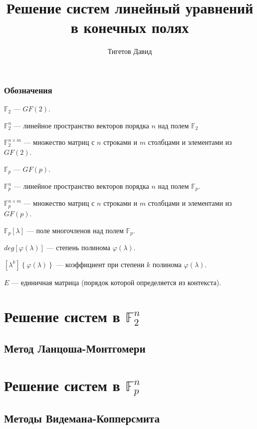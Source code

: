 \documentclass[a4paper,12pt]{book}
\newcommand{\gftwo}{\mathbb{F}_2}
\newcommand{\gftwovector}[1]{\mathbb{F}^{#1}_2}
\newcommand{\gftwomatrix}[2]{\mathbb{F}^{#1 \times #2}_2}
\newcommand{\gfpmatrix}[2]{\mathbb{F}^{#1 \times #2}_p}
\newcommand{\gfpvector}[1]{\mathbb{F}^{#1}_p}
\newcommand{\gfp}{\mathbb{F}_p}
\newcommand{\gfppolynomial}{\gfp \left [ \lambda \right ]}
\newcommand{\polynomial}[1]{ #1 (\lambda)}
\newcommand{\polynomialdegree}[1]{ deg \left [ \polynomial{#1} \right ] }
\newcommand{\degreecoefficient}[2]{ \left [ \lambda^{#1} \right ] \left \{ #2 \right \} }
\begin{document}
\title{Решение систем линейный уравнений в конечных полях}
\author{Тигетов Давид}
\maketitle

\tableofcontents

\section{Обозначения}

$\gftwo$ --- $GF(2)$.

$\gftwovector{n}$ --- линейное пространство векторов порядка $n$ над полем $\gftwo$

$\gftwomatrix{n}{m}$ --- множество матриц с $n$ строками и $m$ столбцами и элементами из $GF(2)$.

$\gfp$ --- $GF(p)$.

$\gfpvector{n}$ --- линейное пространство векторов порядка $n$ над полем $\gfp$.

$\gfpmatrix{n}{m}$ --- множество матриц с $n$ строками и $m$ столбцами и элементами из $GF(p)$.

$\gfppolynomial$ --- поле многочленов над полем $\gfp$.

$\polynomialdegree{\varphi}$ --- степень полинома $\polynomial{\varphi}$.

$\degreecoefficient{k}{\polynomial{\varphi}}$ --- коэффициент при степени $k$ полинома $\polynomial{\varphi}$.

$E$ --- единичная матрица (порядок которой определяется из контекста).

\part{Решение систем в $\gftwovector{n}$}

\chapter{Метод Ланцоша-Монтгомери} \label{chapter:Lancsoz_Montgomery}



\part{Решение систем в $\gfpvector{n}$}

\chapter{Методы Видемана-Копперсмита}
\end{document}
